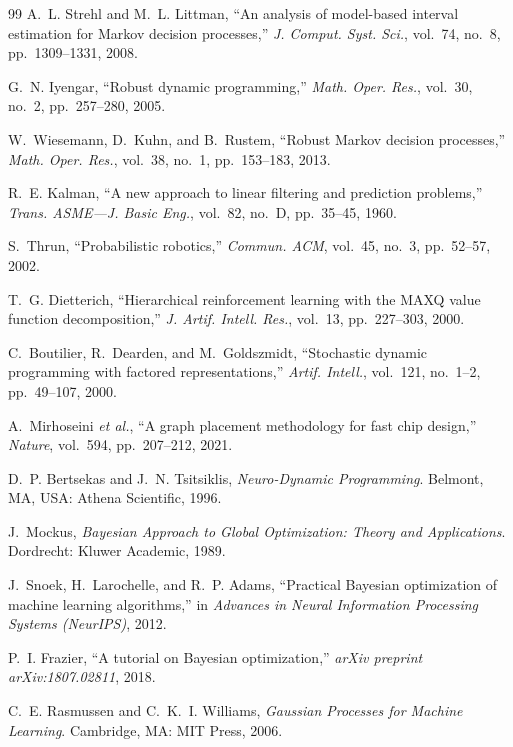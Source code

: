 \documentclass[11pt,letterpaper]{article}
\begin{document}
\begin{thebibliography}{99}
A.~L. Strehl and M.~L. Littman, ``An analysis of model-based interval estimation for Markov decision processes,'' \emph{J. Comput. Syst. Sci.}, vol.~74, no.~8, pp.~1309--1331, 2008.

G.~N. Iyengar, ``Robust dynamic programming,'' \emph{Math. Oper. Res.}, vol.~30, no.~2, pp.~257--280, 2005.

W.~Wiesemann, D.~Kuhn, and B.~Rustem, ``Robust Markov decision processes,'' \emph{Math. Oper. Res.}, vol.~38, no.~1, pp.~153--183, 2013.

R.~E. Kalman, ``A new approach to linear filtering and prediction problems,'' \emph{Trans. ASME---J. Basic Eng.}, vol.~82, no.~D, pp.~35--45, 1960.

S.~Thrun, ``Probabilistic robotics,'' \emph{Commun. ACM}, vol.~45, no.~3, pp.~52--57, 2002.

T.~G. Dietterich, ``Hierarchical reinforcement learning with the MAXQ value function decomposition,'' \emph{J. Artif. Intell. Res.}, vol.~13, pp.~227--303, 2000.

C.~Boutilier, R.~Dearden, and M.~Goldszmidt, ``Stochastic dynamic programming with factored representations,'' \emph{Artif. Intell.}, vol.~121, no.~1--2, pp.~49--107, 2000.

A.~Mirhoseini \emph{et al.}, ``A graph placement methodology for fast chip design,'' \emph{Nature}, vol.~594, pp.~207--212, 2021.

D.~P. Bertsekas and J.~N. Tsitsiklis, \emph{Neuro-Dynamic Programming}. Belmont, MA, USA: Athena Scientific, 1996.

J.~Mockus, \emph{Bayesian Approach to Global Optimization: Theory and Applications}. Dordrecht: Kluwer Academic, 1989.

J.~Snoek, H.~Larochelle, and R.~P. Adams, ``Practical Bayesian optimization of machine learning algorithms,'' in \emph{Advances in Neural Information Processing Systems (NeurIPS)}, 2012.

P.~I. Frazier, ``A tutorial on Bayesian optimization,'' \emph{arXiv preprint arXiv:1807.02811}, 2018.

C.~E. Rasmussen and C.~K.~I. Williams, \emph{Gaussian Processes for Machine Learning}. Cambridge, MA: MIT Press, 2006.


\end{thebibliography}
\end{document}
